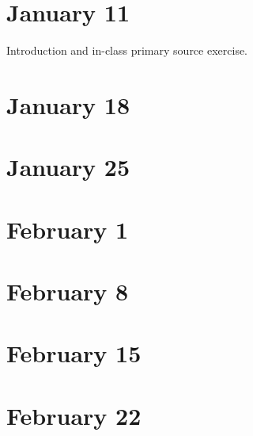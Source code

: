 \documentclass[11pt]{article}
\begin{document}
\small
\let\realeverypar\everypar
\realeverypar{\the\myeverypar\the\everypar}%
\newtoks\everypar %
\everypar{}
\newtoks\myeverypar \myeverypar{}

\myeverypar{\hangindent=1cm \small}

\section{January 11}

Introduction and in-class primary source exercise.

\section{January 18}




\section{January 25}




\section{February 1}


\section{February 8}


\section{February 15}


\section{February 22}

\end{document}
